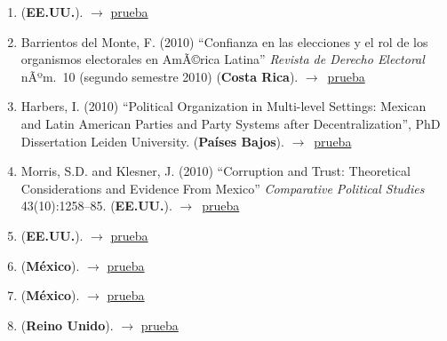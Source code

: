 \documentclass[12 pt, letter]{article}
\newenvironment{CitasMiTrabajo}{
    \begin{footnotesize}
    \begin{enumerate}[label={\footnotesize\emph{cita~\arabic*}},ref=\arabic*] %
        \setlength{\itemsep}{.1\itemsep}
        \setlength{\parskip}{.1\parskip}
    }{\end{enumerate}\end{footnotesize}}
\begin{document}
\begin{CitasMiTrabajo}
        \item {} (\textbf{EE.UU.}).  $\rightarrow$ \href{http://ericmagar.com/cv/cites/estevezEtalElecStud/bumin2009phd.pdf}{prueba}

        \item Barrientos del Monte, F. (2010) ``Confianza en las elecciones y el rol de los organismos electorales en AmÃ©rica Latina'' \emph{Revista de Derecho Electoral} nÃºm.\ 10 (segundo semestre 2010) (\textbf{Costa Rica}). $\rightarrow$~\href{http://ericmagar.com/cv/cites/estevezEtalElecStud/Barrientos.pdf}{prueba}

        \item Harbers, I. (2010)
            ``Political Organization	in Multi-level Settings: Mexican and Latin American Parties and Party Systems after Decentralization'', PhD Dissertation Leiden University. (\textbf{Pa\'ises Bajos}). $\rightarrow$~\href{http://ericmagar.com/cv/cites/estevezEtalElecStud/harbers.excerpt.pdf}{prueba}

        \item Morris, S.D. and Klesner, J. (2010)
            ``Corruption and Trust: Theoretical Considerations and Evidence From Mexico''
            \emph{Comparative Political Studies} 43(10):1258--85. (\textbf{EE.UU.}). $\rightarrow$~\href{http://ericmagar.com/cv/cites/estevezEtalElecStud/morris.klesnerCorruptionTrustMx2010cps.pdf}{prueba}

        \item {} (\textbf{EE.UU.}).  $\rightarrow$ \href{http://ericmagar.com/cv/cites/estevezEtalElecStud/fowler2010phd.pdf}{prueba}

        \item {} (\textbf{M\'exico}).  $\rightarrow$ \href{http://ericmagar.com/cv/cites/estevezEtalElecStud/diazSandoval2011phd.pdf}{prueba}

        \item {} (\textbf{M\'exico}).  $\rightarrow$ \href{http://ericmagar.com/cv/cites/estevezEtalElecStud/barrientos2011.pdf}{prueba}

        \item {} (\textbf{Reino Unido}).  $\rightarrow$ \href{http://ericmagar.com/cv/cites/estevezEtalElecStud/birch2011.pdf}{prueba}


\end{CitasMiTrabajo}
\end{document}
